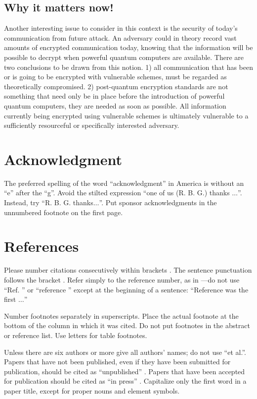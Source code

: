 \documentclass[conference]{IEEEtran}
\begin{document}
\subsection{Why it matters now!}
Another interesting issue to consider in this context is the security of today's communication from future attack.
An adversary could in theory record vast amounts of encrypted communication today, knowing that the information will be possible to decrypt when powerful quantum computers are available.
There are two conclusions to be drawn from this notion.
1) all communication that has been or is going to be encrypted with vulnerable schemes, must be regarded as theoretically compromised.
2) post-quantum encryption standards are not something that need only be in place before the introduction of powerful quantum computers, they are needed as soon as possible.
All information currently being encrypted using vulnerable schemes is ultimately vulnerable to a sufficiently resourceful or specifically interested adversary.


\section*{Acknowledgment}

The preferred spelling of the word ``acknowledgment'' in America is without 
an ``e'' after the ``g''. Avoid the stilted expression ``one of us (R. B. 
G.) thanks $\ldots$''. Instead, try ``R. B. G. thanks$\ldots$''. Put sponsor 
acknowledgments in the unnumbered footnote on the first page.

\section*{References}

Please number citations consecutively within brackets \cite{b1}. The 
sentence punctuation follows the bracket \cite{b2}. Refer simply to the reference 
number, as in \cite{b3}---do not use ``Ref. \cite{b3}'' or ``reference \cite{b3}'' except at 
the beginning of a sentence: ``Reference \cite{b3} was the first $\ldots$''

Number footnotes separately in superscripts. Place the actual footnote at 
the bottom of the column in which it was cited. Do not put footnotes in the 
abstract or reference list. Use letters for table footnotes.

Unless there are six authors or more give all authors' names; do not use 
``et al.''. Papers that have not been published, even if they have been 
submitted for publication, should be cited as ``unpublished'' \cite{b4}. Papers 
that have been accepted for publication should be cited as ``in press'' \cite{b5}. 
Capitalize only the first word in a paper title, except for proper nouns and 
element symbols.
\end{document}

